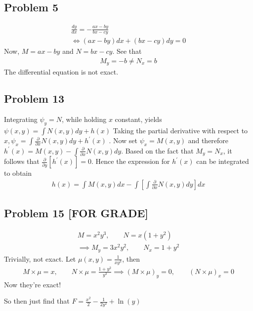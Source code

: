 \documentclass[12pt]{article}
\begin{document}
\subsection*{Problem 5}
\label{sec:org0fe7a9e}
\begin{align*}
  \frac{dy}{dx} = - \frac{ax-by}{bx-cy} \\
  \iff (ax-by)dx + (bx-cy)dy = 0
\end{align*}
Now, \(M = ax-by\) and \(N = bx -cy\). See that
\begin{align*}
  M_y = -b \neq N_x = b
\end{align*}
The differential equation is not exact.

\subsection*{Problem 13}
\label{sec:orgddc8a73}
Integrating \(\psi_{y}=N\), while holding \(x\) constant, yields \(\psi(x, y)=\int
N(x, y) d y+h(x)\) 
Taking the partial derivative with respect to
\(x, \psi_{x}=\int \frac{\partial}{\partial x} N(x, y) d y+h^{\prime}(x)\) .
Now set \(\psi_{x}=M(x,
y)\) and therefore
\(h^{\prime}(x)=M(x, y)-\int \frac{\partial}{\partial x} N(x,y) dy\).
Based on the fact that \(M_{y}=N_{x}\), it follows that
\(\frac{\partial}{\partial y}\left[h^{\prime}(x)\right]=0\). Hence the expression
for \(h^{\prime}(x)\) can be integrated to obtain 
\begin{align*}
h(x)=\int M(x, y) d x-\int\left[\int \frac{\partial}{\partial x} N(x, y) d y\right] d x
\end{align*}

\subsection*{Problem 15 [FOR GRADE]}
\label{sec:orgdcc6856}
\begin{align*}
  M = x^2y^3,\quad \quad N = x(1+y^2)\\
  \implies M_y = 3x^2y^2, \quad \quad N_x = 1+y^2
\end{align*} 
Trivially, not exact. Let \(\mu(x,y) = \frac{1}{xy^3}\),
then
\begin{align*}
  M\times\mu = x, \quad \quad N\times\mu = \frac{1+y^2}{y^3}
  \implies (M\times\mu)_y = 0, \quad \quad (N\times\mu)_x = 0
\end{align*}
Now they're exact! 

So then just find that \(F = \frac{x^2}{2} - \frac{1}{2y^2}+\ln(y)\)
\end{document}
